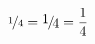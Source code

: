 \documentclass{book}
\def\othernicefrac#1#2{%
    \raise.5ex\hbox{#1}%
    \kern-.1em/\kern-.15em%
    \lower.25ex\hbox{#2}}
\begin{document}
$\displaystyle \nicefrac{1}{4} = \othernicefrac{1}{4} = \frac{1}{4}$
\end{document}
